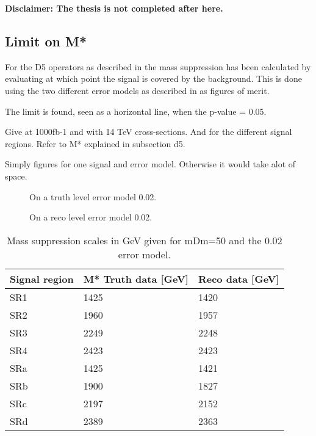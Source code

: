 \textbf{Disclaimer: The thesis is not completed after here.}

\subsection{Limit on M*}\label{sec:res:subsec:m*}
For the D5 operators as described in  the mass suppression has been calculated by evaluating at which point the signal is covered by the background. This is done using the two different error models as described in  as figures of merit.

The limit is found, seen as a horizontal line, when the p-value = 0.05.

Give at 1000fb-1 and with 14 TeV cross-sections. And for the different signal regions.
Refer to M* explained in subsection d5. 

Simply figures for one signal and error model. Otherwise it would take alot of space.


 \begin{figure}[H] %
    \hfill
    \caption{On a truth level error model 0.02.}
    \label{fig:SRnewMt}
  \end{figure}

 \begin{figure}[H] %
    \hfill
    \caption{On a reco level error model 0.02.}
    \label{fig:SRnewMr}
  \end{figure}


\begin{table}[ht]
\begin{center}
\begin{tabular}{|l|l|l|}
\hline
Signal region & M* Truth data [GeV]& Reco data [GeV]\\ \hline
SR1&1425&1420\\
SR2&1960&1957\\
SR3&2249&2248\\
SR4&2423&2423\\ \hline
SRa&1425&1421\\
SRb&1900&1827\\
SRc&2197&2152\\
SRd&2389&2363\\ \hline
\end{tabular}
\caption{Mass suppression scales in GeV given for mDm=50 and the 0.02 error model.}
\label{tab:masssupp002}
\end{center}
\end{table}

